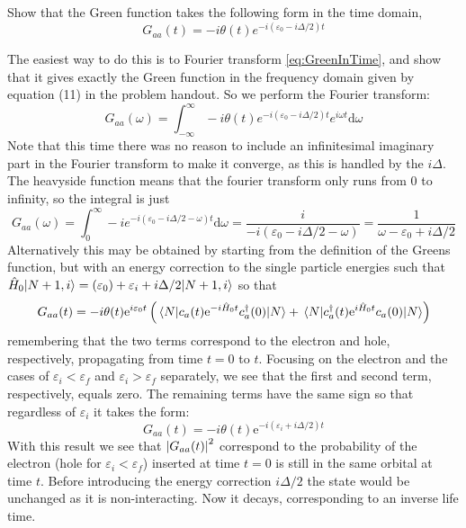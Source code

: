 \begin{exercise}
Show that the Green function takes the following form in the time domain,
\begin{equation}
    G_{aa}(t) = -i \theta(t)e^{-i(\varepsilon_0-i \Delta/2)t}
    \label{eq:GreenInTime}
\end{equation}
\end{exercise}


\begin{solution}
The easiest way to do this is to Fourier transform \eqref{eq:GreenInTime}, and show that it gives exactly the Green function in the frequency domain given by equation (11) in the problem handout. So we perform the Fourier transform:
\begin{equation}
    G_{aa}(\omega) = \int_{-\infty}^{\infty} -i \theta(t)e^{-i(\varepsilon_0-i \Delta/2)t} e^{i \omega t} \mathrm{d} \omega
\end{equation}
Note that this time there was no reason to include an infinitesimal imaginary part in the Fourier transform to make it converge, as this is handled by the $i \Delta$. \\
The heavyside function means that the fourier transform only runs from 0 to infinity, so the integral is just
\begin{equation}
    G_{aa}(\omega) = \int_{0}^{\infty} -i e^{-i(\varepsilon_0-i \Delta/2 - \omega)t}  \mathrm{d} \omega = \frac{i}{-i(\varepsilon_0-i \Delta/2 - \omega)} = \frac{1}{\omega - \varepsilon_0  + i \Delta/2 }
\end{equation}
Alternatively this may be obtained by starting from the definition of the Greens function, but with an energy correction to the single particle energies such that $\hat{H}_0|N+1,i\rangle = (\varepsilon_0) + \varepsilon_i + i\Delta/2|N+1,i\rangle$ so that
\begin{equation}
        G_{aa}(t) = -i\theta(t)\mathrm{e}^{i\varepsilon_0 t}\left(\mel{N}{c_a(t)\mathrm{e}^{-i\hat{H}_0 t}c^{\dagger}_a(0)}{N} + \mel{N}{c^{\dagger}_a(t)\mathrm{e}^{i\hat{H}_0 t}c_a(0)}{N}\right)
\end{equation}
remembering that the two terms correspond to the electron and hole, respectively, propagating from time $t=0$ to $t$. Focusing on the electron and the cases of $\varepsilon_i < \varepsilon_f$ and $\varepsilon_i > \varepsilon_f$ separately, we see that the first and second term, respectively, equals zero. The remaining terms have the same sign so that regardless of $\varepsilon_i$ it takes the form:
\begin{equation}
    G_{aa}(t) =  -i\theta(t)\mathrm{e}^{-i(\varepsilon_i+i\Delta/2)t}
\end{equation}
With this result we see that $\abs{G_{aa}(t)}^2$ correspond to the probability of the electron (hole for $\varepsilon_i < \varepsilon_f$) inserted at time $t=0$ is still in the same orbital at time $t$. Before introducing the energy correction $i\Delta/2$ the state would be unchanged as it is non-interacting. Now it decays, corresponding to an inverse life time.
\end{solution}

